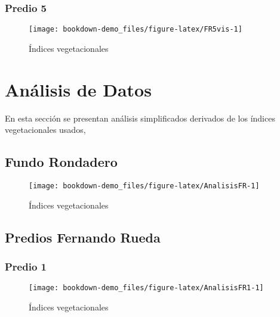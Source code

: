 \documentclass[]{report}
\begin{document}
\subsection{Predio 5}\label{predio-5-1}

\begin{figure}

{\centering \texttt{[image: bookdown-demo\_files/figure-latex/FR5vis-1]} 

}

\caption{Índices vegetacionales}\label{fig:FR5vis}
\end{figure}

\hypertarget{AnalisisDatos}{\chapter{Análisis de
Datos}\label{AnalisisDatos}}

En esta sección se presentan análisis simplificados derivados de los
índices vegetacionales usados,

\section{Fundo Rondadero}\label{fundo-rondadero-2}

\begin{figure}

{\centering \texttt{[image: bookdown-demo\_files/figure-latex/AnalisisFR-1]} 

}

\caption{Índices vegetacionales}\label{fig:AnalisisFR}
\end{figure}

\section{Predios Fernando Rueda}\label{predios-fernando-rueda-2}

\subsection{Predio 1}\label{predio-1-2}

\begin{figure}

{\centering \texttt{[image: bookdown-demo\_files/figure-latex/AnalisisFR1-1]} 

}

\caption{Índices vegetacionales}\label{fig:AnalisisFR1}
\end{figure}
\end{document}
